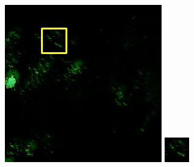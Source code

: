 \documentclass[10pt]{ctexart}
\begin{document}
\begin{multicols}{2}
\begin{figure}[H]
{\begin{minipage}[b]{0.15\linewidth}
            \includegraphics[width=1\linewidth]{../log/spoon2/cut2/LC81620432014072LGN00_16329_spectral.jpg}\vspace{4pt}
            \includegraphics[width=1\linewidth]{../log/spoon2/cut2/tmp_cut_LC81620432014072LGN00_16329_spectral.jpg}\vspace{4pt}

\end{minipage}}
\end{figure}
\end{multicols}
\end{document}
